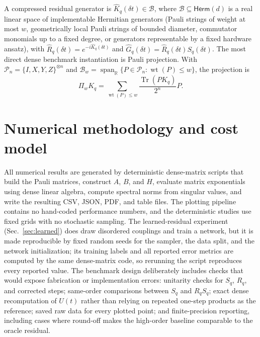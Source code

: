 \documentclass[aps,prxquantum,reprint,superscriptaddress,nofootinbib,amsmath,amssymb]{revtex4-2}
\newcommand{\Tr}{\operatorname{Tr}}
\newcommand{\Span}{\operatorname{span}}
\newcommand{\cB}{\mathcal{B}}
\newcommand{\cP}{\mathcal{P}}
\newcommand{\dt}{\delta t}
\begin{document}
A compressed residual generator is $\widehat K_q(\dt)\in\cB$, where $\cB\subseteq\mathsf{Herm}(d)$ is a real linear space of implementable Hermitian generators (Pauli strings of weight at most $w$, geometrically local Pauli strings of bounded diameter, commutator monomials up to a fixed degree, or generators representable by a fixed hardware ansatz), with $\widehat R_q(\dt)=e^{-i\widehat K_q(\dt)}$ and $\widehat G_q(\dt)=\widehat R_q(\dt)S_q(\dt)$. The most direct dense benchmark instantiation is Pauli projection. With $\cP_n=\{I,X,Y,Z\}^{\otimes n}$ and $\cB_w=\Span_\mathbb{R}\{P\in\cP_n:\operatorname{wt}(P)\leq w\}$, the projection is
\begin{equation}
    \Pi_wK_q=\sum_{\operatorname{wt}(P)\leq w}\frac{\Tr(PK_q)}{2^n}P.
    \label{eq:pauli-proj}
\end{equation}

\section{Numerical methodology and cost model}
\label{app:numerics}

All numerical results are generated by deterministic dense-matrix scripts that build the Pauli matrices, construct $A$, $B$, and $H$, evaluate matrix exponentials using dense linear algebra, compute spectral norms from singular values, and write the resulting CSV, JSON, PDF, and table files. The plotting pipeline contains no hand-coded performance numbers, and the deterministic studies use fixed grids with no stochastic sampling. The learned-residual experiment (Sec.~\ref{sec:learned}) does draw disordered couplings and train a network, but it is made reproducible by fixed random seeds for the sampler, the data split, and the network initialization; its training labels and all reported error metrics are computed by the same dense-matrix code, so rerunning the script reproduces every reported value. The benchmark design deliberately includes checks that would expose fabrication or implementation errors: unitarity checks for $S_q$, $R_q$, and corrected steps; same-order comparisons between $S_q$ and $R_qS_q$; exact dense recomputation of $U(t)$ rather than relying on repeated one-step products as the reference; saved raw data for every plotted point; and finite-precision reporting, including cases where round-off makes the high-order baseline comparable to the oracle residual.
\end{document}
